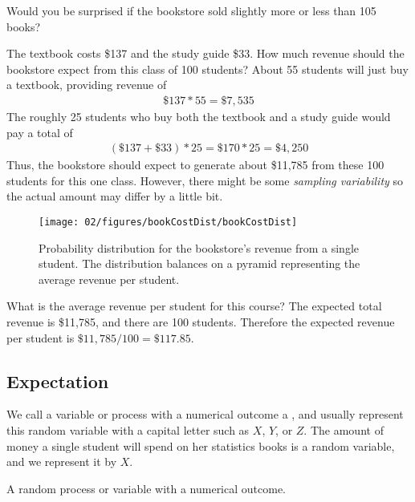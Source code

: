 \begin{exercise}
Would you be surprised if the bookstore sold slightly more or less than 105 books?
\end{exercise}

\begin{example}{The textbook costs \$137 and the study guide \$33. How much revenue should the bookstore expect from this class of 100 students?}\label{bookStoreRev}
About 55 students will just buy a textbook, providing revenue of
\begin{eqnarray*}
\$137 * 55 = \$7,535
\end{eqnarray*}
The roughly 25 students who buy both the textbook and a study guide would pay a total of
\begin{eqnarray*}
(\$137 + \$33) * 25 = \$170 * 25 = \$4,250
\end{eqnarray*}
Thus, the bookstore should expect to generate about \$11,785 from these 100 students for this one class. However, there might be some \emph{sampling variability} so the actual amount may differ by a little bit.
\end{example}
\begin{figure}
\centering
\texttt{[image: 02/figures/bookCostDist/bookCostDist]}
\caption{Probability distribution for the bookstore's revenue from a single student. The distribution balances on a pyramid representing the average revenue per student.}
\label{bookCostDist}
\end{figure}

\begin{example}{What is the average revenue per student for this course?}\label{revFromStudent}
The expected total revenue is \$11,785, and there are 100 students. Therefore the expected revenue per student is $\$11,785/100 =  \$117.85$.
\end{example}

\subsection{Expectation}

We call a variable or process with a numerical outcome a , and usually represent this random variable with a capital letter such as $X$, $Y$, or $Z$. The amount of money a single student will spend on her statistics books is a random variable, and we represent it by $X$.

\begin{termBox}{
A random process or variable with a numerical outcome.}
\end{termBox}

